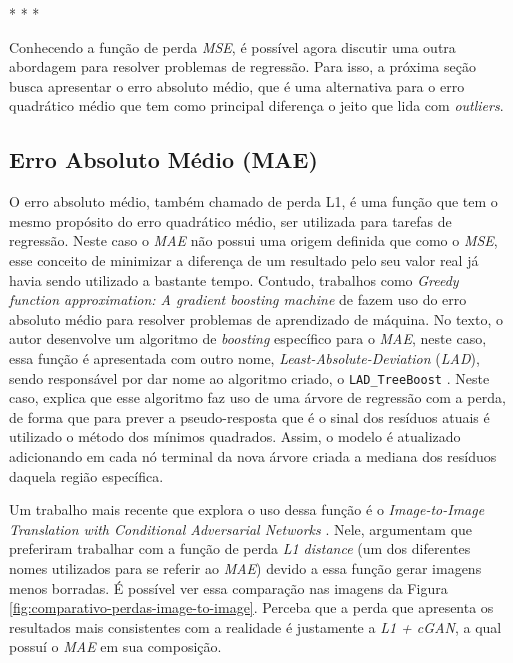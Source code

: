 \medskip
\begin{center}
 * * *
\end{center}
\medskip

Conhecendo a função de perda \textit{MSE}, é possível agora discutir uma outra abordagem para resolver problemas de regressão. Para isso, a próxima seção busca apresentar o erro absoluto médio, que é uma alternativa para o erro quadrático médio que tem como principal diferença o jeito que lida com \textit{outliers}.

\subsection{Erro Absoluto Médio (MAE)} 
\label{sec:mae-loss}

O erro absoluto médio, também chamado de perda L1, é uma função que tem o mesmo propósito do erro quadrático médio, ser utilizada para tarefas de regressão. Neste caso o \textit{MAE} não possui uma origem definida que como o \textit{MSE}, esse conceito de minimizar a diferença de um resultado pelo seu valor real já havia sendo utilizado a bastante tempo. Contudo, trabalhos como \textit{Greedy function approximation: A gradient boosting machine} de \textcite{GreedyFunctionApproximation} fazem uso do erro absoluto médio para resolver problemas de aprendizado de máquina. No texto, o autor desenvolve um algoritmo de \textit{boosting} específico para o \textit{MAE}, neste caso, essa função é apresentada com outro nome, \textit{Least-Absolute-Deviation} (\textit{LAD}), sendo responsável por dar nome ao algoritmo criado, o \texttt{LAD\_TreeBoost} \parencite{GreedyFunctionApproximation}. Neste caso, \textcite{GreedyFunctionApproximation} explica que esse algoritmo faz uso de uma árvore de regressão com a perda, de forma que para prever a pseudo-resposta que é o sinal dos resíduos atuais é utilizado o método dos mínimos quadrados. Assim, o modelo é atualizado adicionando em cada nó terminal da nova árvore criada a mediana dos resíduos daquela região específica.

Um trabalho mais recente que explora o uso dessa função é o \textit{Image-to-Image Translation with Conditional Adversarial Networks} \parencite{ImageToImage}. Nele, \textcite{ImageToImage} argumentam que preferiram trabalhar com a função de perda \textit{L1 distance} (um dos diferentes nomes utilizados para se referir ao \textit{MAE}) devido a essa função gerar imagens menos borradas. É possível ver essa comparação nas imagens da Figura \ref{fig:comparativo-perdas-image-to-image}. Perceba que a perda que apresenta os resultados mais consistentes com a realidade é justamente a \textit{L1 + cGAN}, a qual possuí o \textit{MAE} em sua composição.

